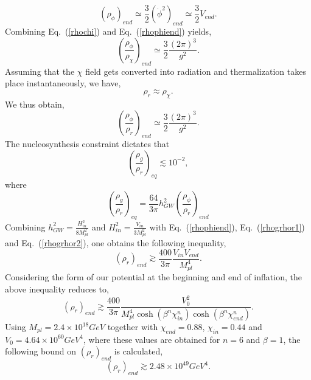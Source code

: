 \documentclass[prd,twocolumn,superscriptaddress]{revtex4}
\begin{document}
\begin{appendices}
\begin{equation}
(\rho_{\phi})_{end} \simeq \frac{3}{2} (\dot{\phi}^2 )_{end} \simeq \frac{3}{2} V_{end}\label{rhophiend}.
\end{equation}
Combining Eq.~(\ref{rhochi}) and Eq.~(\ref{rhophiend}) yields,
\begin{equation}
{\left( \frac{\rho_{\phi}}{\rho_{\chi}} \right)}_{end} \simeq \frac{3}{2} \frac{(2 \pi)^3}{g^2} \label{ratiorhophirhochi}.
\end{equation}
Assuming that the $\chi$ field gets converted into radiation and thermalization takes place instantaneously, we have,
\begin{equation}
\rho_r \approx \rho_{\chi}.
\end{equation}
We thus obtain,
\begin{equation}
{\left( \frac{\rho_{\phi}}{\rho_r} \right)}_{end} \simeq \frac{3}{2} \frac{(2 \pi)^3}{g^2}. \label{ratiorhophirhor}
\end{equation}
The nucleosynthesis constraint \cite{ala} dictates that
\begin{equation}
 \left(\frac{\rho_g}{\rho_r}\right)_{eq} \lesssim 10^{-2}, \label{rhogrhor1}
\end{equation}
where
\begin{equation}
 \left(\frac{\rho_g}{\rho_r}\right)_{eq}
 = \frac{64}{3 \pi} h_{GW}^2 \left(\frac{\rho_{\phi}}{\rho_r}\right)_{end} \label{rhogrhor2}
\end{equation}
Combining $h_{GW}^2 = \frac{H_{in}^2}{8 M_{pl}^2}$ and $H_{in}^2 = \frac{V_{in}}{3 M_{pl}^2}$ with Eq.~(\ref{rhophiend}),
Eq.~(\ref{rhogrhor1}) and Eq.~(\ref{rhogrhor2}), one obtains the following inequality,
\begin{equation}
 (\rho_r)_{end} \gtrsim  \frac{400 }{3 \pi} \frac{V_{in} V_{end}}{M_{pl}^4}. \label{ineqrhor}
\end{equation}
Considering the form of our potential at the beginning and end of inflation, the above inequality reduces to,
\begin{equation}
 (\rho_r)_{end} \gtrsim  \frac{400 }{3 \pi} \frac{V_{0}^2 }{M_{pl}^4 \cosh{(\beta^n \chi_{in}^n)} \cosh{(\beta^n \chi_{end}^n)}}.
\end{equation}
Using $M_{pl} = 2.4 \times 10^{18} GeV$ together with $\chi_{end} = 0.88$, $\chi_{in} = 0.44$ and
$V_0= 4.64 \times 10^{60} GeV^4$, where these values are obtained for $n=6$ and $\beta=1$, the following bound
on $(\rho_r)_{end}$ is calculated,
\begin{equation}
 (\rho_r)_{end} \gtrsim 2.48 \times 10^{49} GeV^4.

\end{equation}
\end{appendices}
\end{document}
